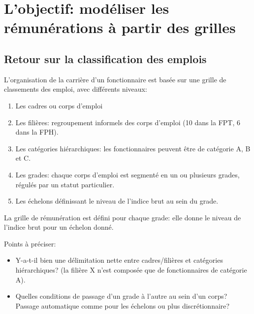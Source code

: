 \documentclass[11pt,a4paper]{article}
\begin{document}
\else \fi



\section{L'objectif: modéliser les rémunérations à partir des grilles}


\subsection*{Retour sur la classification des emplois}

L'organisation de la carrière d'un fonctionnaire est basée sur une grille de classements des emploi, avec différents niveaux:
 
\begin{enumerate}[leftmargin=2cm ,parsep=0cm,itemsep=0cm,topsep=0cm] 
\item Les cadres ou corps d'emploi
\item Les filières: regroupement informels des corps d'emploi (10 dans la FPT, 6 dans la FPH). 
\item Les catégories hiérarchiques: les fonctionnaires peuvent être de catégorie A, B et C. 
\item Les grades: chaque corps d'emploi est segmenté en un ou plusieurs grades, régulés par un statut particulier. 
\item Les échelons définissant le niveau de l'indice brut au sein du grade. 
\end{enumerate}

\vspace{0.5cm}

La grille de rémunération est défini pour chaque grade: elle donne le niveau de l'indice brut pour un échelon donné. 


Points à préciser: 
\begin{itemize}[leftmargin=1cm ,parsep=0cm,itemsep=0cm,topsep=0cm] 
\item Y-a-t-il bien une délimitation nette entre cadres/filières et catégories hiérarchiques? (la filière X n'est composée que de fonctionnaires de catégorie A). 
\item Quelles conditions de passage d'un grade à l'autre au sein d'un corps? Passage automatique comme pour les échelons ou plus discrétionnaire? 
\end{itemize}
\end{document}

